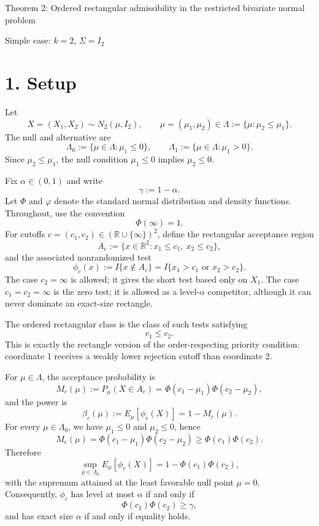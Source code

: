 \documentclass[12pt]{article}
\theoremstyle{definition}
\theoremstyle{remark}
\begin{document}
\begin{center}
{\Large Theorem 2: Ordered rectangular admissibility in the restricted bivariate normal problem}

\vspace{0.5em}
{\large Simple case: $k=2$, $\Sigma=I_2$}
\end{center}

\section*{1. Setup}

Let
\[
X=(X_1,X_2)\sim N_2(\mu,I_2),
\qquad
\mu=(\mu_1,\mu_2)\in\Lambda:=\{\mu:\mu_2\le \mu_1\}.
\]
The null and alternative are
\[
\Lambda_0:=\{\mu\in\Lambda:\mu_1\le 0\},
\qquad
\Lambda_1:=\{\mu\in\Lambda:\mu_1>0\}.
\]
Since $\mu_2\le \mu_1$, the null condition $\mu_1\le0$ implies $\mu_2\le0$.

Fix $\alpha\in(0,1)$ and write
\[
\gamma:=1-\alpha.
\]
Let $\Phi$ and $\varphi$ denote the standard normal distribution and density functions.  Throughout, use the convention
\[
\Phi(\infty)=1.
\]
For cutoffs $c=(c_1,c_2)\in(\mathbb R\cup\{\infty\})^2$, define the rectangular acceptance region
\[
A_c:=\{x\in\mathbb R^2:x_1\le c_1,\ x_2\le c_2\},
\]
and the associated nonrandomized test
\[
\phi_c(x):=I\{x\notin A_c\}
=I\{x_1>c_1\text{ or }x_2>c_2\}.
\]
The case $c_2=\infty$ is allowed; it gives the short test based only on $X_1$.  The case $c_1=c_2=\infty$ is the zero test; it is allowed as a level-$\alpha$ competitor, although it can never dominate an exact-size rectangle.

The ordered rectangular class is the class of such tests satisfying
\[
c_1\le c_2.
\]
This is exactly the rectangle version of the order-respecting priority condition: coordinate 1 receives a weakly lower rejection cutoff than coordinate 2.

For $\mu\in\Lambda$, the acceptance probability is
\begin{equation}\label{eq:miss-probability}
M_c(\mu):=
P_\mu(X\in A_c)
=
\Phi(c_1-\mu_1)\Phi(c_2-\mu_2),
\end{equation}
and the power is
\[
\beta_c(\mu):=
E_\mu[\phi_c(X)]
=1-M_c(\mu).
\]
For every $\mu\in\Lambda_0$, we have $\mu_1\le0$ and $\mu_2\le0$, hence
\[
M_c(\mu)
=\Phi(c_1-\mu_1)\Phi(c_2-\mu_2)
\ge
\Phi(c_1)\Phi(c_2).
\]
Therefore
\[
\sup_{\mu\in\Lambda_0}E_\mu[\phi_c(X)]
=1-\Phi(c_1)\Phi(c_2),
\]
with the supremum attained at the least favorable null point $\mu=0$.
Consequently, $\phi_c$ has level at most $\alpha$ if and only if
\begin{equation}\label{eq:level-constraint}
\Phi(c_1)\Phi(c_2)\ge \gamma,
\end{equation}
and has exact size $\alpha$ if and only if equality holds.
\end{document}
